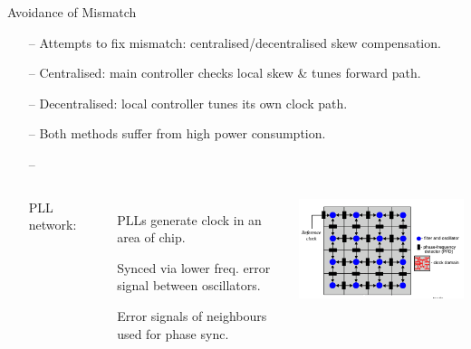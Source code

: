 \documentclass{beamer}
\begin{document}
\begin{frame}{Avoidance of Mismatch}

    \begin{itemize}
        \item[--]
            Attempts to fix mismatch: centralised/decentralised skew compensation.
        \item[--]
            Centralised: main controller checks local skew \& tunes forward path.
        \item[--]
            Decentralised: local controller tunes its own clock path.
        \item[--]
            Both methods suffer from high power consumption.
        \item[--]
        \begin{columns}        	
        	\flushleft
            PLL network:
             \begin{itemize}
	            \item[]
	           	 	PLLs generate clock in an area of chip.
	            \item[]
	            	Synced via lower freq. error signal between oscillators.
	            \item[]
	            	Error signals of neighbours used for phase sync.
            \end{itemize}
        	\includegraphics[scale=0.55]{network_ccic2013}
        \end{columns}
     \end{itemize}   
 
\end{frame}
\end{document}
